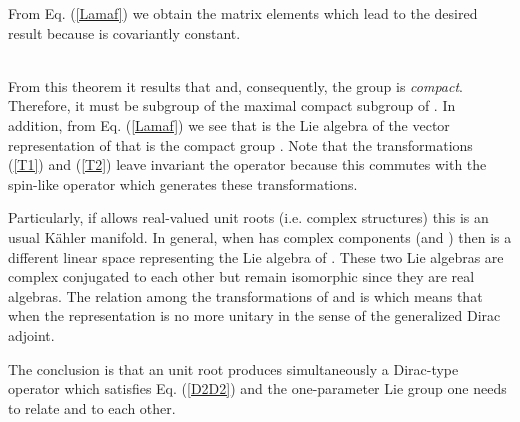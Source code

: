 \documentclass[a4paper,12pt]{article}
\begin{document}
\begin{demo}
From Eq. (\ref{Lamaf}) we obtain the matrix elements
\coordHE{}
which lead to the desired result because \coordHE{} is covariantly constant. 
\end{demo}\\
From this theorem it results that \myHighlight{$\alpha\in [0,2\pi]$}\coordHE{} and, consequently, 
the group \coordHE{} is {\em compact}. Therefore, it must be  
subgroup of the maximal compact subgroup of \coordHE{}. In addition, 
from Eq. (\ref{Lamaf}) we see that \coordHE{} is the Lie algebra of the 
vector representation of \coordHE{} that is the compact group 
\coordHE{}. 
Note that the transformations (\ref{T1}) and (\ref{T2})  
leave invariant the operator \coordHE{}  because this commutes 
with the spin-like operator \coordHE{} which generates these transformations.  

Particularly, if \coordHE{} allows real-valued unit roots (i.e. complex structures) 
this is an usual K\" ahler manifold. In general, when \coordHE{} has complex 
components (and \coordHE{}) then \coordHE{} is a different linear 
space representing the Lie algebra of \coordHE{}. These two Lie 
algebras are complex conjugated to each other but remain isomorphic since 
they are real algebras.  
The relation among the transformations of \coordHE{} and 
\coordHE{} is
\coordHE{} 
which means that when \coordHE{} the representation \coordHE{} is 
no more unitary in the sense of the generalized Dirac adjoint. 

The conclusion is that an unit root produces simultaneously a Dirac-type 
operator \coordHE{} which satisfies Eq. (\ref{D2D2}) and the one-parameter  
Lie group \coordHE{} one needs to relate \coordHE{} and \coordHE{} to each 
other.  
   
\end{document}
